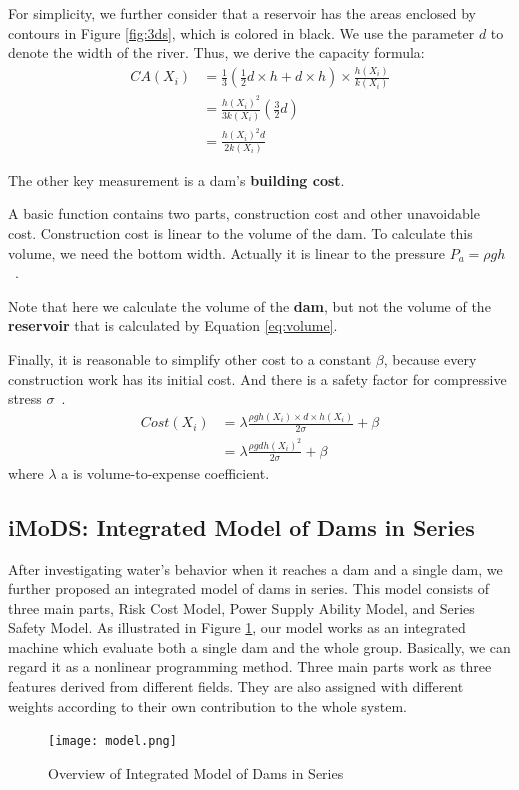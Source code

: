\documentclass{mcmthesis}
\begin{document}
For simplicity, we further consider that a reservoir has the areas enclosed by contours in Figure \ref{fig:3ds}, which is colored in black. We use the parameter $d$ to denote the width of the river. Thus, we derive the capacity formula:
\begin{align}
\label{eq:volume}
CA(X_i) &= \frac{1}{3}(\frac{1}{2}d\times h + d\times h)\times \frac{h(X_i)}{k(X_i)}\nonumber\\
	&= \frac{h(X_i)^2}{3k(X_i)}(\frac{3}{2}d)\nonumber\\
	&= \frac{h(X_i)^2d}{2k(X_i)}
\end{align}

The other key measurement is a dam's \textbf{building cost}.

A basic function contains two parts, construction cost and other unavoidable cost. Construction cost is linear to the volume of the dam. To calculate this volume, we need the bottom width. Actually it is linear to the pressure $P_a = \rho gh$~\cite{Finite}.

Note that here we calculate the volume of the \textbf{dam}, but not the volume of the \textbf{reservoir} that is calculated by Equation \eqref{eq:volume}.

Finally, it is reasonable to simplify other cost to a constant $\beta$, because every construction work has its initial cost. And there is a safety factor for compressive stress $\sigma$~\cite{Finite}.
\begin{align}
\label{eq:Cost}
Cost(X_i) &= \lambda \frac{\rho g h(X_i) \times d \times h(X_i)}{2\sigma} + \beta\nonumber\\
	&= \lambda \frac{\rho g d h(X_i)^2}{2\sigma}+\beta
\end{align}
where $\lambda$ a is volume-to-expense coefficient.
\subsection{iMoDS: Integrated Model of Dams in Series}
After investigating water's behavior when it reaches a dam and a single dam, we further proposed an integrated model of dams in series. This model consists of three main parts, Risk Cost Model, Power Supply Ability Model, and Series Safety Model. As illustrated in Figure \ref{fig:model}, our model works as an integrated machine which evaluate both a single dam and the whole group. Basically, we can regard it as a nonlinear programming method. Three main parts work as three features derived from different fields. They are also assigned with different weights according to their own contribution to the whole system.
\begin{figure}
    \centering
    \texttt{[image: model.png]}
    \caption{Overview of Integrated Model of Dams in Series}
    \label{fig:model}
\end{figure}
\end{document}
